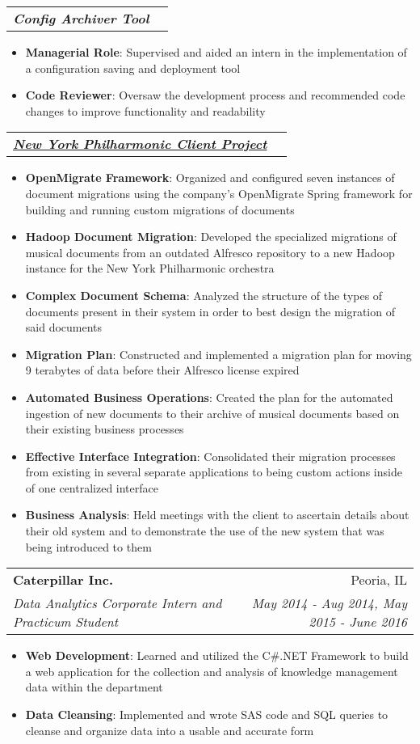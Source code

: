 \documentclass[letterpaper,11pt]{article}
\makeatletter
\newcommand{\resumeItem}[2]{
  \item\small{
    \textbf{#1}{: #2 \vspace{-2pt}}
  }
}
\newcommand{\resumeSubheading}[4]{
  \vspace{-1pt}\item
    \begin{tabular*}{0.97\textwidth}{l@{\extracolsep{\fill}}r}
      \textbf{\large{#1}} & #2 \\
      \textit{\small#3} & \textit{\small #4} \\
    \end{tabular*}\vspace{-5pt}
}
\newcommand{\resumeJobTitle}[2]{
    \begin{tabular*}{0.97\textwidth}{l@{\extracolsep{\fill}}r}
      \textit{\small#1} & \textit{\small #2} \\
    \end{tabular*}\vspace{-5pt}
}
\newcommand{\resumeItemListStart}{\begin{itemize}}
\newcommand{\resumeItemListEnd}{\end{itemize}\vspace{-5pt}}
\makeatother
\begin{document}
    \resumeJobTitle{\textbf{Config Archiver Tool}}{}
      \resumeItemListStart
        \resumeItem{Managerial Role}
          {Supervised and aided an intern in the implementation of a configuration saving and deployment tool}
        \resumeItem{Code Reviewer}
          {Oversaw the development process and recommended code changes to improve functionality and readability}
      \resumeItemListEnd


    \resumeJobTitle{\textbf{\href{http://archives.nyphil.org/index.php/about-us}{New York Philharmonic Client Project}}}{}
      \resumeItemListStart
        \resumeItem{OpenMigrate Framework}
            {Organized and configured seven instances of document migrations using the company's OpenMigrate Spring framework for building and running custom migrations of documents}
        \resumeItem{Hadoop Document Migration}
            {Developed the specialized migrations of musical documents from an outdated Alfresco repository to a new Hadoop instance for the New York Philharmonic orchestra}
        \resumeItem{Complex Document Schema}
            {Analyzed the structure of the types of documents present in their system in order to best design the migration of said documents}
        \resumeItem{Migration Plan}
            {Constructed and implemented a migration plan for moving 9 terabytes of data before their Alfresco license expired}
        \resumeItem{Automated Business Operations}
            {Created the plan for the automated ingestion of new documents to their archive of musical documents based on their existing business processes}
        \resumeItem{Effective Interface Integration}
            {Consolidated their migration processes from existing in several separate applications to being custom actions inside of one centralized interface}
        \resumeItem{Business Analysis}
            {Held meetings with the client to ascertain details about their old system and to demonstrate the use of the new system that was being introduced to them}
      \resumeItemListEnd


    \resumeSubheading
      {Caterpillar Inc.}{Peoria, IL}
      {Data Analytics Corporate Intern and Practicum Student}{May 2014 - Aug 2014, May 2015 - June 2016}
      \resumeItemListStart
        \resumeItem{Web Development}
          {Learned and utilized the C\#.NET Framework to build a web application for the collection and analysis of knowledge management data within the department}
        \resumeItem{Data Cleansing}
          {Implemented and wrote SAS code and SQL queries to cleanse and organize data into a usable and accurate form}
      \resumeItemListEnd
\end{document}

